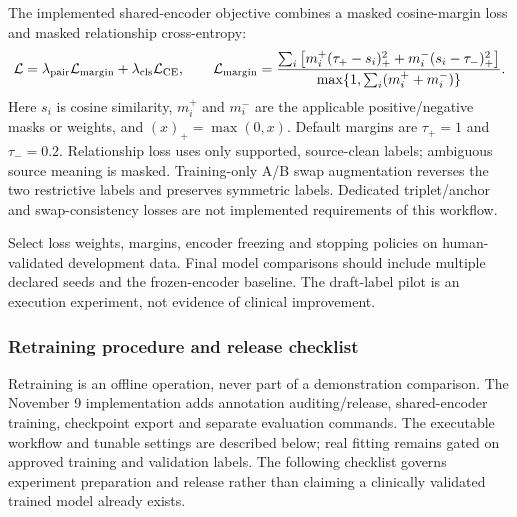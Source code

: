 \documentclass[10pt,letterpaper]{article}
\begin{document}
The implemented shared-encoder objective combines a masked cosine-margin
loss and masked relationship cross-entropy:
\[
 \mathcal L=\lambda_{\rm pair}\mathcal L_{\rm margin}
          +\lambda_{\rm cls}\mathcal L_{\rm CE},
 \qquad
 \mathcal L_{\rm margin}=
 \frac{\sum_i\left[m_i^+(\tau_+-s_i)_+^2+
                       m_i^-(s_i-\tau_-)_+^2\right]}
      {\max\{1,\sum_i(m_i^++m_i^-)\}}.
\]
Here $s_i$ is cosine similarity, $m_i^+$ and $m_i^-$ are the applicable
positive/negative masks or weights, and $(x)_+=\max(0,x)$. Default margins
are $\tau_+=1$ and $\tau_-=0.2$. Relationship loss uses only supported,
source-clean labels; ambiguous source meaning is masked. Training-only A/B
swap augmentation reverses the two restrictive labels and preserves
symmetric labels. Dedicated triplet/anchor and swap-consistency losses are
not implemented requirements of this workflow.

Select loss weights, margins, encoder freezing and stopping policies on
human-validated development data. Final model comparisons should include
multiple declared seeds and the frozen-encoder baseline. The draft-label
pilot is an execution experiment, not evidence of clinical improvement.

\subsubsection{Retraining procedure and release checklist}
\label{sec:retraining}
Retraining is an offline operation, never part of a demonstration comparison.
The November 9 implementation adds annotation auditing/release, shared-encoder
training, checkpoint export and separate evaluation commands. The executable
workflow and tunable settings are described below; real fitting remains gated
on approved training and validation labels. The following checklist governs
experiment preparation and release rather than claiming a clinically validated
trained model already exists.
\end{document}

